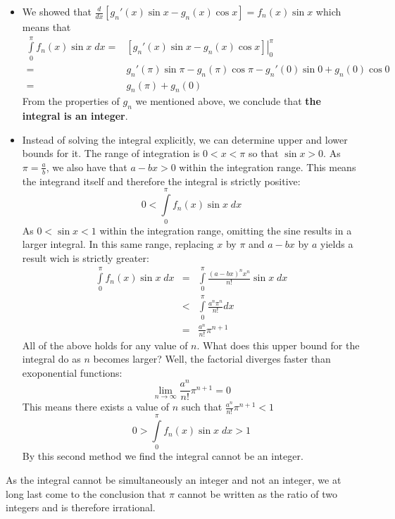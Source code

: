\begin{itemize}
\item We showed that $\frac{d}{dx} \left[ g_n'(x) \sin x - g_n(x) \cos x \right] = f_n (x) \sin x$ which means that
\begin{eqnarray*}
\int\limits_{0}^{\pi} f_n(x) \sin x \; dx = & \left. \left[ g_n'(x) \sin x - g_n(x) \cos x \right]\right|_{0}^{\pi} \\
= & g_n'(\pi) \sin \pi - g_n (\pi) \cos \pi - g_n' (0) \sin 0 + g_n(0) \cos 0 \\
= & g_n(\pi) + g_n(0)
\end{eqnarray*}
\noindent From the properties of $g_n$ we mentioned above, we conclude that \textbf{the integral is an integer}.
\item Instead of solving the integral explicitly, we can determine upper and lower bounds for it. The range of integration is $0<x<\pi$ so that $\sin x > 0$. As $\pi = \frac{a}{b}$, we also have that $a - bx >0 $ within the integration range. This means the integrand itself and therefore the integral is strictly positive:
$$
0 < \int\limits_{0}^{\pi} f_n(x) \sin x \; dx
$$
\noindent As $ 0 < \sin x < 1$ within the integration range, omitting the sine results in a larger integral. In this same range, replacing $x$ by $\pi$ and $a-bx$ by $a$ yields a result wich is strictly greater:
\begin{eqnarray*}
\int\limits_{0}^{\pi} f_n(x) \sin x \; dx & = &   \int\limits_{0}^{\pi} \frac{\left( a - bx \right)^n x^n}{n!} \sin x \; dx \\
 & < & \int\limits_{0}^{\pi} \frac{a^n \pi^n}{n!} dx \\
& = & \frac{a^n}{n!}\pi^{n+1}
\end{eqnarray*}
\noindent All of the above holds for any value of $n$. What does this upper bound for the integral do as $n$ becomes larger? Well, the factorial diverges faster than exoponential functions:
$$
\lim\limits_{n \rightarrow \infty} \frac{a^n}{n!}\pi^{n+1} = 0
$$
\noindent This means there exists a value of $n$ such that $\frac{a^n}{n!}\pi^{n+1} < 1$
$$
 0 > \int\limits_{0}^{\pi} f_n(x) \sin x \; dx > 1
$$
\noindent By this second method we find the integral cannot be an integer.
\end{itemize}
\noindent As the integral cannot be simultaneously an integer and not an integer, we at long last come to the conclusion that $\pi$ cannot be written as the ratio of two integers and is therefore irrational.